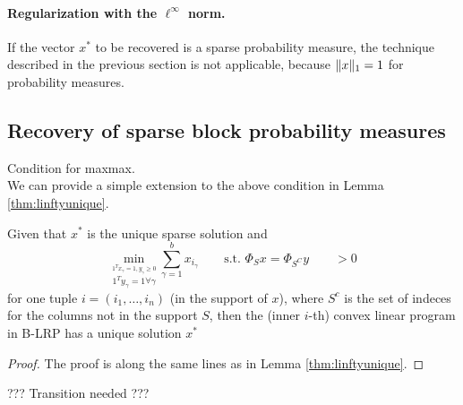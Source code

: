 \documentclass{article} %
\begin{document}
\paragraph{Regularization with the $\ell^\infty$ norm.} If the vector $x^*$ to be recovered is a sparse probability measure, the technique described in the previous section is not applicable, because $\lVert x\rVert_1 = 1$ for probability measures.





\subsection{Recovery of sparse block probability measures}

Condition for maxmax.\\ 

We can provide a simple extension to the above condition in Lemma \ref{thm:linftyunique}.
\begin{lemma} \label{thm:linftyunique_block}
Given that $x^*$ is the unique sparse solution and 
\begin{equation*}
\min_{\overset{1^Tx_{\gamma} = 1, y_{\gamma} \geq 0}{1^Ty_{\gamma} =1 \forall \gamma}} \sum_{\gamma =1}^b x_{i_{\gamma}} \qquad \text{s.t. } \Phi_S x = \Phi_{S^C} y \qquad>0
\end{equation*}
for one tuple $i = (i_1, \dots, i_n)$ (in the support of $x$), where $S^c$ is the set of indeces for the columns not in the support $S$, then the (inner $i$-th) convex linear program in B-LRP has a unique solution $x^*$
\end{lemma}
\begin{proof}
The proof is along the same lines as in Lemma \ref{thm:linftyunique}.
\end{proof}

??? Transition needed ???
\end{document}
